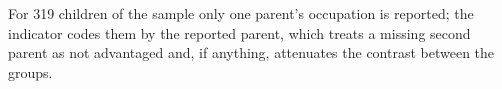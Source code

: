 For 319 children of the sample only one parent's occupation is reported; the indicator codes them by the reported parent, which treats a missing second parent as not advantaged and, if anything, attenuates the contrast between the groups.%
